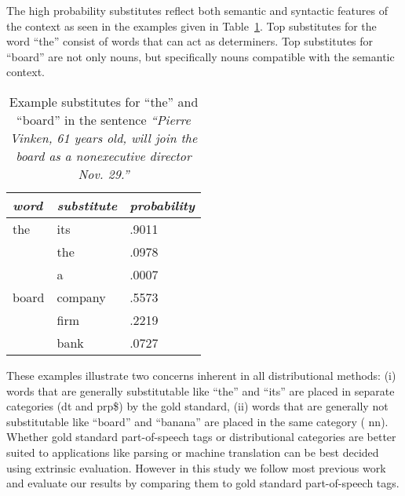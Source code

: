
The high probability substitutes reflect both semantic and syntactic
features of the context as seen in the examples given in
Table~\ref{tab:subs}.  Top substitutes for the word ``the'' consist of
words that can act as determiners.  Top substitutes for ``board'' are
not only nouns, but specifically nouns compatible with the semantic
context.


\begin{table}[h]\centering
\begin{tabular}{|l|ll|} \hline
\emph{word} & \emph{substitute} & \emph{probability} \\ \hline
the	& its & .9011 \\
	& the & .0978 \\
	& a & .0007 \\ \hline
board	& company & .5573 \\
	& firm & .2219 \\
	& bank & .0727 \\ \hline
\end{tabular}
\caption{Example substitutes for ``the'' and ``board'' in the sentence {\em ``Pierre Vinken, 61 years old, will join the  board as a nonexecutive director Nov. 29.''}}
\label{tab:subs}
\end{table}


These examples illustrate two concerns inherent in all distributional
methods: (i) words that are generally substitutable like ``the'' and
``its'' are placed in separate categories ({\sc dt} and {\sc prp\$})
by the gold standard, (ii) words that are generally not substitutable
like ``board'' and ``banana'' are placed in the same category ({\sc
  nn}).  
Whether gold standard part-of-speech tags or distributional categories
are better suited to applications like parsing or machine translation
can be best decided using extrinsic evaluation.  However in this study
we follow most previous work and evaluate our results by comparing
them to gold standard part-of-speech tags.


